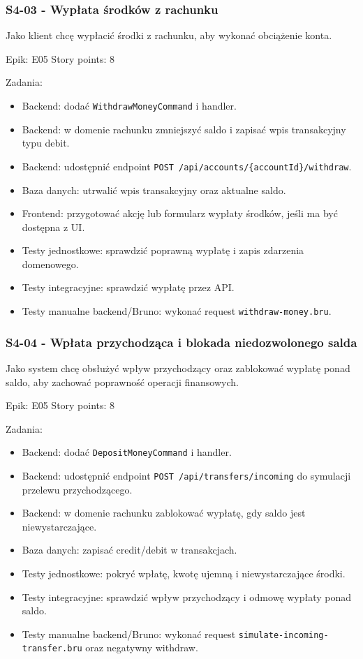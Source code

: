 \documentclass[12pt,a4paper]{article}
\begin{document}
\subsubsection*{S4-03 - Wypłata środków z rachunku}

Jako klient chcę wypłacić środki z rachunku, aby wykonać obciążenie konta.

Epik: E05
Story points: 8

Zadania:

\begin{itemize}
\item Backend: dodać \texttt{WithdrawMoneyCommand} i handler.
\item Backend: w domenie rachunku zmniejszyć saldo i zapisać wpis transakcyjny typu debit.
\item Backend: udostępnić endpoint \texttt{POST /api/accounts/\{accountId\}/withdraw}.
\item Baza danych: utrwalić wpis transakcyjny oraz aktualne saldo.
\item Frontend: przygotować akcję lub formularz wypłaty środków, jeśli ma być dostępna z UI.
\item Testy jednostkowe: sprawdzić poprawną wypłatę i zapis zdarzenia domenowego.
\item Testy integracyjne: sprawdzić wypłatę przez API.
\item Testy manualne backend/Bruno: wykonać request \texttt{withdraw-money.bru}.
\end{itemize}

\subsubsection*{S4-04 - Wpłata przychodząca i blokada niedozwolonego salda}

Jako system chcę obsłużyć wpływ przychodzący oraz zablokować wypłatę ponad saldo, aby zachować poprawność operacji finansowych.

Epik: E05
Story points: 8

Zadania:

\begin{itemize}
\item Backend: dodać \texttt{DepositMoneyCommand} i handler.
\item Backend: udostępnić endpoint \texttt{POST /api/transfers/incoming} do symulacji przelewu przychodzącego.
\item Backend: w domenie rachunku zablokować wypłatę, gdy saldo jest niewystarczające.
\item Baza danych: zapisać credit/debit w transakcjach.
\item Testy jednostkowe: pokryć wpłatę, kwotę ujemną i niewystarczające środki.
\item Testy integracyjne: sprawdzić wpływ przychodzący i odmowę wypłaty ponad saldo.
\item Testy manualne backend/Bruno: wykonać request \texttt{simulate-incoming-transfer.bru} oraz negatywny withdraw.
\end{itemize}
\end{document}
